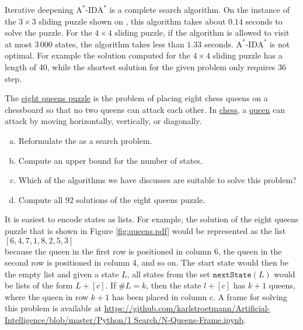Iterative deepening $\mathrm{A}^*$-$\mathrm{IDA}^*$ is a complete search algorithm.
On the instance of the $3 \times 3$ sliding puzzle shown on , this
algorithm takes about $0.14$ seconds to solve the puzzle.  For the $4 \times 4$ sliding puzzle, if the algorithm
is allowed to visit at most $3\,000$ states, the algorithm takes less than $1.33$ seconds.
 $\mathrm{A}^*$-$\mathrm{IDA}^*$ is not optimal.  For example the solution computed for 
the $4 \times 4$ sliding puzzle has a length of 40, while the shortest solution for the given problem only
requires 36 step.


\exercise
The \href{https://en.wikipedia.org/wiki/Eight_queens_puzzle}{eight queens puzzle} is the problem of  placing
eight chess queens on a chessboard so that no two queens can attack each other.  In
\href{https://en.wikipedia.org/wiki/Chess}{chess}, a \href{https://en.wikipedia.org/wiki/Queen_(chess)}{queen}
can attack by moving horizontally, vertically, or diagonally.  
\begin{enumerate}[(a)]
\item Reformulate the  as a search problem.
\item Compute an upper bound for the number of states.
\item Which of the algorithms we have discusses are suitable to solve this problem?
\item Compute all 92 solutions of the eight queens puzzle.  
\end{enumerate}

\hint
It is easiest to encode states as lists.  For example, the solution of the eight queens puzzle that is shown in
Figure \ref{fig:queens.pdf} would be represented as the list 
\\[0.2cm]
\hspace*{1.3cm}
$[6, 4, 7, 1, 8, 2, 5, 3]$
\\[0.2cm]
because the queen in the first row is positioned in column 6, the queen in the second row is positioned in
column 4, and so on.  The start state would then be the empty list and given a state $L$, all states from the
set $\mathtt{nextState}(L)$ would be lists of the form $L + [c]$.  If $\#L = k$, then the state $l + [c]$ has
$k+1$ queens, where the queen in row $k+1$ has been placed in column $c$.
A frame for solving this problem is available at
\href{https://github.com/karlstroetmann/Artificial-Intelligence/blob/master/Python/1
  Search/N-Queens-Frame.ipynb}{https://github.com/karlstroetmann/Artificial-Intelligence/blob/master/Python/1 Search/N-Queens-Frame.ipynb}.


